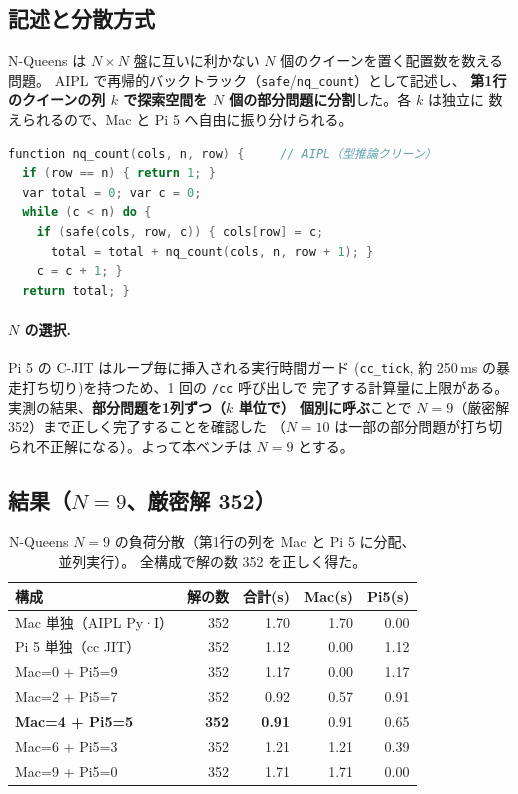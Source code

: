 \documentclass[a4paper,11pt]{ltjsarticle}
\newcommand{\cmd}[1]{\texttt{#1}}
\begin{document}
\subsection{記述と分散方式}
N-Queens は $N\times N$ 盤に互いに利かない $N$ 個のクイーンを置く配置数を数える問題。
AIPL で再帰的バックトラック（\cmd{safe}/\cmd{nq\_count}）として記述し、
\textbf{第1行のクイーンの列 $k$ で探索空間を $N$ 個の部分問題に分割}した。各 $k$ は独立に
数えられるので、Mac と Pi 5 へ自由に振り分けられる。

\begin{lstlisting}[language=C]
function nq_count(cols, n, row) {     // AIPL（型推論クリーン）
  if (row == n) { return 1; }
  var total = 0; var c = 0;
  while (c < n) do {
    if (safe(cols, row, c)) { cols[row] = c;
      total = total + nq_count(cols, n, row + 1); }
    c = c + 1; }
  return total; }
\end{lstlisting}

\paragraph{$N$ の選択.}Pi 5 の C-JIT はループ毎に挿入される実行時間ガード
(\cmd{cc\_tick}, 約 250\,ms の暴走打ち切り)を持つため、1 回の \cmd{/cc} 呼び出しで
完了する計算量に上限がある。実測の結果、\textbf{部分問題を1列ずつ（$k$ 単位で）
個別に呼ぶ}ことで $N{=}9$（厳密解 352）まで正しく完了することを確認した
（$N{=}10$ は一部の部分問題が打ち切られ不正解になる）。よって本ベンチは $N{=}9$ とする。

\subsection{結果（$N=9$、厳密解 352）}
\begin{table}[h]\centering
\begin{tabular}{lrrrr}
\toprule
構成 & 解の数 & 合計(s) & Mac(s) & Pi5(s) \\
\midrule
Mac 単独（AIPL Py·I）        & 352 & 1.70 & 1.70 & 0.00 \\
Pi 5 単独（cc JIT）          & 352 & 1.12 & 0.00 & 1.12 \\
Mac=0 + Pi5=9               & 352 & 1.17 & 0.00 & 1.17 \\
Mac=2 + Pi5=7               & 352 & 0.92 & 0.57 & 0.91 \\
\textbf{Mac=4 + Pi5=5}      & \textbf{352} & \textbf{0.91} & 0.91 & 0.65 \\
Mac=6 + Pi5=3               & 352 & 1.21 & 1.21 & 0.39 \\
Mac=9 + Pi5=0               & 352 & 1.71 & 1.71 & 0.00 \\
\bottomrule
\end{tabular}
\caption{N-Queens $N{=}9$ の負荷分散（第1行の列を Mac と Pi 5 に分配、並列実行）。
全構成で解の数 352 を正しく得た。}
\end{table}
\end{document}

